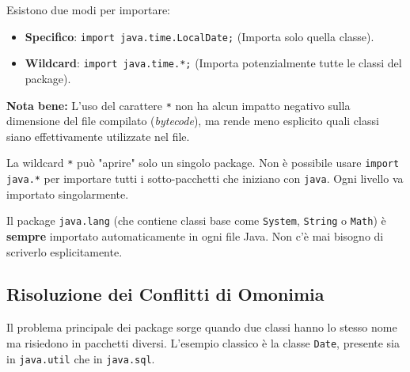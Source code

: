 \begin{observation}
Esistono due modi per importare:
\begin{itemize}
    \item \textbf{Specifico}: \texttt{import java.time.LocalDate;} (Importa solo quella classe).
    \item \textbf{Wildcard}: \texttt{import java.time.*;} (Importa potenzialmente tutte le classi del package).
\end{itemize}
\textbf{Nota bene:} L'uso del carattere \texttt{*} non ha alcun impatto negativo sulla dimensione del file compilato (\textit{bytecode}), ma rende meno esplicito quali classi siano effettivamente utilizzate nel file.
\end{observation}

\begin{warningbox}
    La wildcard \texttt{*} può "aprire" solo un singolo package. Non è possibile usare \texttt{import java.*} per importare tutti i sotto-pacchetti che iniziano con \texttt{java}. Ogni livello va importato singolarmente.
\end{warningbox}

\begin{tip}
    Il package \texttt{java.lang} (che contiene classi base come \texttt{System}, \texttt{String} o \texttt{Math}) è \textbf{sempre} importato automaticamente in ogni file Java. Non c'è mai bisogno di scriverlo esplicitamente.
\end{tip}

\subsection{Risoluzione dei Conflitti di Omonimia}
Il problema principale dei package sorge quando due classi hanno lo stesso nome ma risiedono in pacchetti diversi. L'esempio classico è la classe \texttt{Date}, presente sia in \texttt{java.util} che in \texttt{java.sql}.

